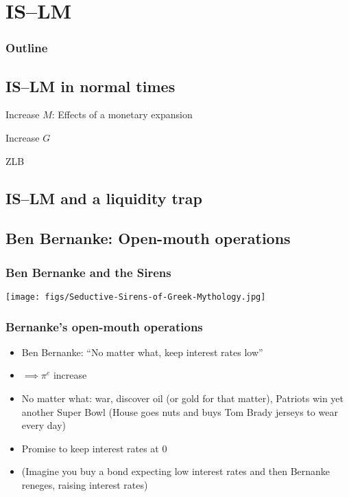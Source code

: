 \documentclass[presentation,dvipsnames]{beamer}
\begin{document}
\section{IS--LM}

\begin{frame}
\frametitle{Outline}
\tableofcontents[currentsection]
\end{frame}

\subsection{IS--LM in normal times}
\label{sec-5}
\begin{frame}[label=sec-5-1]{Increase $M$: Effects of a monetary expansion}

\end{frame}
\begin{frame}[label=sec-5-2]{Increase $G$}
\end{frame}
\begin{frame}[label=sec-5-3]{ZLB}
\end{frame}

\subsection{IS--LM and a liquidity trap}

\subsection{Ben Bernanke: Open-mouth operations}


\begin{frame}
\frametitle{Ben Bernanke and the Sirens}
\centerline{\texttt{[image: figs/Seductive-Sirens-of-Greek-Mythology.jpg]}}
\end{frame}

\begin{frame}
\frametitle{Bernanke's open-mouth operations}
\begin{itemize}[label={--}]
\item Ben Bernanke: ``No matter what, keep interest rates low''
\item $\implies \pi^{e}$ increase
\item No matter what: war,
discover oil (or gold for that matter),
Patriots win yet another Super Bowl (House goes nuts and buys Tom Brady jerseys to wear every day)
\item Promise to keep interest rates at 0
\item (Imagine you buy a bond expecting low interest rates and then Bernanke reneges, raising interest rates)
\end{itemize}
\end{frame}
\end{document}
